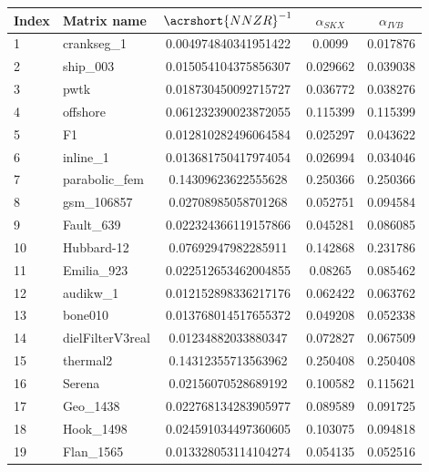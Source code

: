 \begin{tabular}{|l|l|S[round-mode=places,round-precision=4]|S[round-mode=places,round-precision=4]|S[round-mode=places,round-precision=4]|}
\toprule
{Index} & {Matrix name} &  {$\acrshort{NNZR}^{-1}$} & {$\alpha_{SKX}$} & {$\alpha_{IVB}$}  \\
\midrule
{1}& {	crankseg\_1                }	& 0.004974840341951422	& 0.0099	& 0.017876	\\
{2}& {	ship\_003                  }	& 0.015054104375856307	& 0.029662	& 0.039038	\\
{3}& {	pwtk                      }	& 0.018730450092715727	& 0.036772	& 0.038276	\\
{4}& {	offshore                  }	& 0.061232390023872055	& 0.115399	& 0.115399	\\
{5}& {	F1                        }	& 0.012810282496064584	& 0.025297	& 0.043622	\\
{6}& {	inline\_1                  }	& 0.013681750417974054	& 0.026994	& 0.034046	\\
{7}& {	parabolic\_fem             }	& 0.14309623622555628	& 0.250366	& 0.250366	\\
{8}& {	gsm\_106857                }	& 0.02708985058701268	& 0.052751	& 0.094584	\\
{9}& {	Fault\_639                 }	& 0.022324366119157866	& 0.045281	& 0.086085	\\
{10}& {	Hubbard-12                }	& 0.07692947982285911	& 0.142868	& 0.231786	\\
{11}& {	Emilia\_923                }	& 0.022512653462004855	& 0.08265	& 0.085462	\\
{12}& {	audikw\_1                  }	& 0.012152898336217176	& 0.062422	& 0.063762	\\
{13}& {	bone010                   }	& 0.013768014517655372	& 0.049208	& 0.052338	\\
{14}& {	dielFilterV3real          }	& 0.01234882033880347	& 0.072827	& 0.067509	\\
{15}& {	thermal2                  }	& 0.14312355713563962	& 0.250408	& 0.250408	\\
{16}& {	Serena                    }	& 0.02156070528689192	& 0.100582	& 0.115621	\\
{17}& {	Geo\_1438                  }	& 0.022768134283905977	& 0.089589	& 0.091725	\\
{18}& {	Hook\_1498                 }	& 0.024591034497360605	& 0.103075	& 0.094818	\\
{19}& {	Flan\_1565                 }	& 0.013328053114104274	& 0.054135	& 0.052516	\\

\end{tabular}
